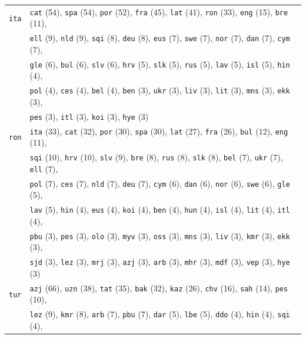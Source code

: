 \begin{center}
\begin{longtable}{ll}
\texttt{ita} & \texttt{cat} (54), \texttt{spa} (54), \texttt{por} (52), \texttt{fra} (45), \texttt{lat} (41), \texttt{ron} (33), \texttt{eng} (15), \texttt{bre} (11),\\
 & \texttt{ell} (9), \texttt{nld} (9), \texttt{sqi} (8), \texttt{deu} (8), \texttt{eus} (7), \texttt{swe} (7), \texttt{nor} (7), \texttt{dan} (7), \texttt{cym} (7),\\
 & \texttt{gle} (6), \texttt{bul} (6), \texttt{slv} (6), \texttt{hrv} (5), \texttt{slk} (5), \texttt{rus} (5), \texttt{lav} (5), \texttt{isl} (5), \texttt{hin} (4),\\
 & \texttt{pol} (4), \texttt{ces} (4), \texttt{bel} (4), \texttt{ben} (3), \texttt{ukr} (3), \texttt{liv} (3), \texttt{lit} (3), \texttt{mns} (3), \texttt{ekk} (3),\\
 & \texttt{pes} (3), \texttt{itl} (3), \texttt{koi} (3), \texttt{hye} (3) \\
\texttt{ron} & \texttt{ita} (33), \texttt{cat} (32), \texttt{por} (30), \texttt{spa} (30), \texttt{lat} (27), \texttt{fra} (26), \texttt{bul} (12), \texttt{eng} (11),\\
 & \texttt{sqi} (10), \texttt{hrv} (10), \texttt{slv} (9), \texttt{bre} (8), \texttt{rus} (8), \texttt{slk} (8), \texttt{bel} (7), \texttt{ukr} (7), \texttt{ell} (7),\\
 & \texttt{pol} (7), \texttt{ces} (7), \texttt{nld} (7), \texttt{deu} (7), \texttt{cym} (6), \texttt{dan} (6), \texttt{nor} (6), \texttt{swe} (6), \texttt{gle} (5),\\
 & \texttt{lav} (5), \texttt{hin} (4), \texttt{eus} (4), \texttt{koi} (4), \texttt{ben} (4), \texttt{hun} (4), \texttt{isl} (4), \texttt{lit} (4), \texttt{itl} (4),\\
 & \texttt{pbu} (3), \texttt{pes} (3), \texttt{olo} (3), \texttt{myv} (3), \texttt{oss} (3), \texttt{mns} (3), \texttt{liv} (3), \texttt{kmr} (3), \texttt{ekk} (3),\\
 & \texttt{sjd} (3), \texttt{lez} (3), \texttt{mrj} (3), \texttt{azj} (3), \texttt{arb} (3), \texttt{mhr} (3), \texttt{mdf} (3), \texttt{vep} (3), \texttt{hye} (3) \\
\texttt{tur} & \texttt{azj} (66), \texttt{uzn} (38), \texttt{tat} (35), \texttt{bak} (32), \texttt{kaz} (26), \texttt{chv} (16), \texttt{sah} (14), \texttt{pes} (10),\\
 & \texttt{lez} (9), \texttt{kmr} (8), \texttt{arb} (7), \texttt{pbu} (7), \texttt{dar} (5), \texttt{lbe} (5), \texttt{ddo} (4), \texttt{hin} (4), \texttt{sqi} (4),\\

\end{longtable}
\end{center}
